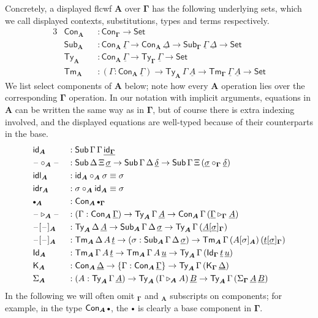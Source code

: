 \documentclass[12pt,a4paper,twoside,openany]{book}
\theoremstyle{remark}
\theoremstyle{definition}
\theoremstyle{theorem}
\newcommand{\ms}[1]{\mathsf{#1}}
\newcommand{\bs}[1]{\boldsymbol{#1}}
\newcommand{\id}{\mathsf{id}}
\newcommand{\Con}{\mathsf{Con}}
\newcommand{\Sub}{\mathsf{Sub}}
\newcommand{\Tm}{\mathsf{Tm}}
\newcommand{\Ty}{\mathsf{Ty}}
\newcommand{\Id}{\mathsf{Id}}
\newcommand{\blank}{\mathord{\hspace{1pt}\text{--}\hspace{1pt}}}
\newcommand{\ra}{\rightarrow}
\newcommand{\Set}{\mathsf{Set}}
\newcommand{\ext}{\triangleright}
\newcommand{\emptycon}{\scaleobj{.75}\bullet}
\newcommand{\K}{\mathsf{K}}
\newcommand{\bGamma}{\bs{\Gamma}}
\newcommand{\bA}{\bs{A}}
\newcommand{\ul}[1]{\underline{#1}}
\newcommand{\ulGamma}{\ul{\Gamma}}
\newcommand{\ulDelta}{\ul{\Delta}}
\newcommand{\uldelta}{\ul{\delta}}
\newcommand{\ulsigma}{\ul{\sigma}}
\newcommand{\ult}{\ul{t}}
\newcommand{\ulu}{\ul{u}}
\newcommand{\ulA}{\ul{A}}
\newcommand{\ulB}{\ul{B}}
\begin{document}
Concretely, a displayed flcwf $\bA$ over $\bGamma$ has the following underlying
sets, which we call displayed contexts, substitutions, types and terms
respectively.
\begin{alignat*}{3}
  & \Con_{\bA} && : \Con_{\bGamma}\ra \Set\\
  & \Sub_{\bA} && : \Con_{\bA}\,\ulGamma \ra \Con_{\bA}\,\ulDelta \ra \Sub_{\bGamma}\,\ulGamma\,\ulDelta \ra \Set \\
  & \Ty_{\bA}  && : \Con_{\bA}\,\ulGamma \ra \Ty_{\bGamma}\,\ulGamma \ra \Set\\
  & \Tm_{\bA}  && : (\Gamma : \Con_{\bA}\,\ulGamma)\ra \Ty_{\bA}\,\Gamma\,\ulA \ra \Tm_{\bGamma}\,\ulGamma\,\ulA \ra \Set
\end{alignat*}
We list select components of $\bA$ below; note how every $\bA$ operation lies
over the corresponding $\bGamma$ operation. In our notation with implicit
arguments, equations in $\bA$ can be written the same way as in $\bGamma$, but
of course there is extra indexing involved, and the displayed equations are
well-typed because of their counterparts in the base.
\begin{alignat*}{3}
  & \id_{\bA} &&: \Sub\,\Gamma\,\Gamma\,\ul{\id_{\bGamma}}\\
  & \blank\circ_{\bA}\blank &&: \Sub\,\Delta\,\Xi\,\ulsigma \to \Sub\,\Gamma\,\Delta\,\uldelta
    \to \Sub\,\Gamma\,\Xi\,(\ulsigma \circ_{\bGamma} \uldelta)\\
  & \ms{idl}_{\bA} &&:  \id_{\bA} \circ_{\bA} \sigma \equiv \sigma \\
  & \ms{idr}_{\bA} &&:  \sigma \circ_{\bA} \id_{\bA} \equiv \sigma \\
  & \emptycon_{\bA} && : \Con_{\bA}\,\emptycon_{\bGamma}\\
  & \blank\ext_{\bA}\blank && : (\Gamma : \Con_{\bA}\,\ulGamma)\ra \Ty_{\bA}\,\Gamma\,\ulA \ra
                     \Con_{\bA}\,\Gamma\,(\ulGamma \ext_{\bGamma} \ulA)\\
  & \blank[\blank]_{\bA} && : \Ty_{\bA}\,\Delta\,\ulA \ra \Sub_{\bA}\,\Gamma\,\Delta\,\ulsigma
                     \ra \Ty_{\bA}\,\Gamma\, (\ulA[\ulsigma]_{\bGamma})\\
  & \blank[\blank]_{\bA} && : \Tm_{\bA}\,\Delta\,A\,\ult \ra (\sigma : \Sub_{\bA}\,\Gamma\,\Delta\,\ulsigma)
                        \ra \Tm_{\bA}\,\Gamma\, (A[\sigma]_{\bA})\,(\ult[\ulsigma]_{\bGamma})\\
  &\Id_{\bA} &&: \Tm_{\bA}\,\Gamma\,A\,\ult \to \Tm_{\bA}\,\Gamma\,A\,\ulu \to \Ty_{\bA}\,\Gamma\,(\Id_{\bGamma}\,\ult\,\ulu)\\
  &\K_{\bA} &&: \Con_{\bA}\,\ulDelta \to \{\Gamma : \Con_{\bA}\,\ulGamma\} \to \Ty_{\bA}\,\Gamma\,(\K_{\bGamma}\,\ulDelta)\\
  &\Sigma_{\bA} &&: (A : \Ty_{\bA}\,\Gamma\,\ulA) \to \Ty_{\bA}\,(\Gamma \ext_{\bA} A)\,\ulB \to
                   \Ty_{\bA}\,\Gamma\,(\Sigma_{\bGamma}\,\ulA\,\ulB)
\end{alignat*}
In the following we will often omit $_{\bGamma}$ and $_{\bA}$ subscripts on
components; for example, in the type $\Con_{\bA}\,\emptycon$, the $\emptycon$ is
clearly a base component in $\bGamma$.
\end{document}
